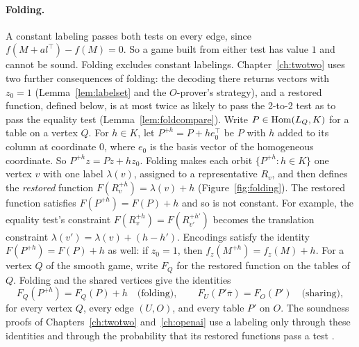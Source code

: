 \paragraph{Folding.}\label{nt:folding} A constant labeling passes both tests on every edge, since $f(M+al^\top)-f(M)=0$. So a game built from either test has value $1$ and cannot be sound. Folding excludes constant labelings. Chapter~\ref{ch:twotwo} uses two further consequences of folding: the decoding there returns vectors with $z_0=1$ (Lemma~\ref{lem:labelset} and the $O$-prover's strategy), and a restored function, defined below, is at most twice as likely to pass the 2-to-2 test as to pass the equality test (Lemma~\ref{lem:foldcompare}). Write $P\in\operatorname{Hom}(L_Q,K)$ for a table on a vertex $Q$. For $h\in K$, let $P^{+h}=P+he_0^\top$ be $P$ with $h$ added to its column at coordinate $0$, where $e_0$ is the basis vector of the homogeneous coordinate. So $P^{+h}z=Pz+hz_0$. Folding makes each orbit $\{P^{+h}:h\in K\}$ one vertex $v$ with one label $\lambda(v)$, assigned to a representative $R_v$, and then defines the \emph{restored} function $F(R_v^{+h})=\lambda(v)+h$ (Figure~\ref{fig:folding}). The restored function satisfies $F(P^{+h})=F(P)+h$ and so is not constant. For example, the equality test's constraint $F(R_v^{+h})=F(R_{v'}^{+h'})$ becomes the translation constraint $\lambda(v')=\lambda(v)+(h-h')$. Encodings satisfy the identity $F(P^{+h})=F(P)+h$ as well: if $z_0=1$, then $f_z(M^{+h})=f_z(M)+h$. For a vertex $Q$ of the smooth game, write $F_Q$ for the restored function on the tables of $Q$. Folding and the shared vertices give the identities
\[
F_Q(P^{+h})=F_Q(P)+h\quad\text{(folding)},\qquad F_U(P'\bar\pi)=F_O(P')\quad\text{(sharing)},
\]
for every vertex $Q$, every edge $(U,O)$, and every table $P'$ on $O$. The soundness proofs of Chapters~\ref{ch:twotwo} and~\ref{ch:openai} use a labeling only through these identities and through the probability that its restored functions pass a test \cite[Proposition~5.3]{OAI}.

